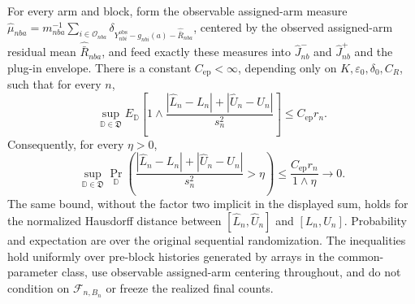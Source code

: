 For every arm and block, form the observable assigned-arm measure \(\widehat\mu_{nba}=m_{nba}^{-1}\sum_{i\in\mathcal O_{nba}}\delta_{Y_{nbi}^{\mathrm{obs}}-g_{nbi}(a)-\widehat{\bar R}_{nba}}\), centered by the observed assigned-arm residual mean \(\widehat{\bar R}_{nba}\), and feed exactly these measures into \(\widehat J_{nb}^{-}\) and \(\widehat J_{nb}^{+}\) and the plug-in envelope. There is a constant \(C_{\mathrm{ep}}<\infty\), depending only on \(K,\varepsilon_0,\delta_0,C_R\), such that for every \(n\), \[\sup_{\mathbb D\in\mathfrak D}E_{\mathbb D}\left[1\wedge\frac{|\widehat L_n-L_n|+|\widehat U_n-U_n|}{s_n^2}\right]\le C_{\mathrm{ep}}r_n.\] Consequently, for every \(\eta>0\), \[\sup_{\mathbb D\in\mathfrak D}\Pr_{\mathbb D}\left(\frac{|\widehat L_n-L_n|+|\widehat U_n-U_n|}{s_n^2}>\eta\right)\le\frac{C_{\mathrm{ep}}r_n}{1\wedge\eta}\longrightarrow0.\] The same bound, without the factor two implicit in the displayed sum, holds for the normalized Hausdorff distance between \([\widehat L_n,\widehat U_n]\) and \([L_n,U_n]\). Probability and expectation are over the original sequential randomization. The inequalities hold uniformly over pre-block histories generated by arrays in the common-parameter class, use observable assigned-arm centering throughout, and do not condition on \(\mathcal F_{n,B_n}\) or freeze the realized final counts.